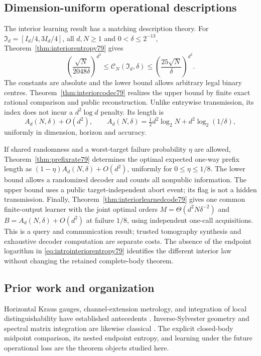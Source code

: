 \subsection{Dimension-uniform operational descriptions}
The interior learning result has a matching description theory.
For $\mathfrak I_d=[I_d/4,3I_d/4]$, all $d,N\ge1$ and
$0<\delta\le2^{-13}$, Theorem~\ref{thm:interiorentropy79} gives
\begin{equation}\label{eq:introinteriorentropy79}
 \left(\frac{\sqrt N}{2048\delta}\right)^{d^2}
 \le\mathcal C_N(\mathfrak I_d,\delta)
 \le\left(\frac{25\sqrt N}{\delta}\right)^{d^2}.
\end{equation}
The constants are absolute and the lower bound allows arbitrary
legal binary centres.  Theorem~\ref{thm:interiorcodec79} realizes
the upper bound by finite exact rational comparison and public
reconstruction.  Unlike entrywise transmission, its index does not
incur a $d^2\log d$ penalty.  Its length is
\[
 A_d(N,\delta)+O(d^2),\qquad
 A_d(N,\delta)=\tfrac12d^2\log_2N+d^2\log_2(1/\delta),
\]
uniformly in dimension, horizon and accuracy.

If shared randomness and a worst-target failure probability $\eta$
are allowed, Theorem~\ref{thm:prefixrate79} determines the optimal
expected one-way prefix length as
$(1-\eta)A_d(N,\delta)+O(d^2)$, uniformly for $0\le\eta\le1/8$.
The lower bound allows a randomized decoder and counts all nonpublic
information.  The upper bound uses a public target-independent
abort event; its flag is not a hidden transmission.
Finally, Theorem~\ref{thm:interiorlearnedcode79} gives one common
finite-output learner with the joint optimal orders
$M=\Theta(d^2N\delta^{-2})$ and $B=A_d(N,\delta)+O(d^2)$ at
failure $1/8$, using independent one-call acquisitions.  This is a
query and communication result; trusted tomography synthesis and
exhaustive decoder computation are separate costs.
The absence of the endpoint logarithm in
\eqref{eq:introinteriorentropy79} identifies the different interior
law without changing the retained complete-body theorem.

\subsection{Prior work and organization}
Horizontal Kraus gauges, channel-extension metrology, and integration
of local distinguishability have established antecedents
\cite{FI76,DKG67,DM76,KGAD76,YF76,SD76}.
Inverse-Sylvester geometry and spectral matrix integration are likewise
classical \cite{Dittmann76,SZGeom76}. The explicit closed-body
midpoint comparison, its nested endpoint entropy, and learning under
the future operational loss are the theorem objects studied here.

